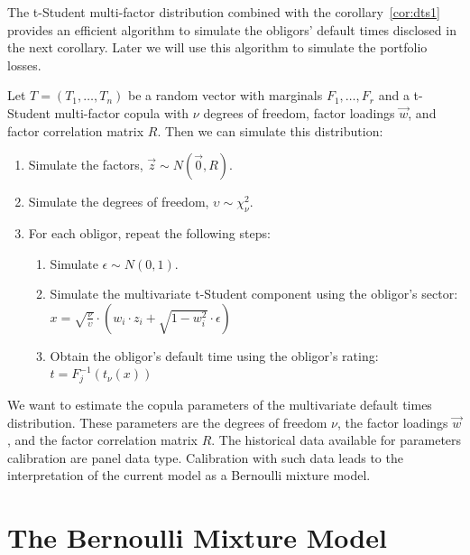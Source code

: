 \documentclass[11pt,fleqn]{book} %
\begin{document}
The t-Student multi-factor distribution combined with the corollary~\ref{cor:dts1} 
provides an efficient algorithm to simulate the obligors' default times 
disclosed in the next corollary. Later we will use this algorithm to simulate
the portfolio losses.

\begin{corollary}
	\label{cor:dts2}
	Let $T=(T_1, \dots, T_n)$ be a random vector with marginals 
	$F_1, \dots, F_r$ and a t-Student multi-factor copula with 
	$\nu$ degrees of freedom, factor loadings $\vec{w}$, and factor correlation 
	matrix $R$. Then we can simulate this distribution:
	\begin{enumerate}
		\item Simulate the factors, $\vec{z} \sim N(\vec{0},R)$.
		\item Simulate the degrees of freedom, $\upsilon \sim \chi_{\nu}^2$.
		\item For each obligor, repeat the following steps:
		\begin{enumerate}
			\item Simulate $\epsilon \sim N(0,1)$.
			\item Simulate the multivariate t-Student component using the obligor's sector:\\
			$
				x = \sqrt{\frac{\nu}{\upsilon}} \cdot \left( w_i \cdot z_i + \sqrt{1-w_i^2} \cdot \epsilon \right)
			$
			\item Obtain the obligor's default time using the obligor's rating:\\
			$
				t = F_j^{-1}\left(t_{\nu}(x)\right)
			$
		\end{enumerate}
	\end{enumerate}
\end{corollary}

We want to estimate the copula parameters of the multivariate default times
distribution. These parameters are the degrees of freedom $\nu$, the factor 
loadings $\vec{w}$, and the factor correlation matrix $R$. The historical 
data available for parameters calibration are panel data type. Calibration 
with such data leads to the interpretation of the current model as a Bernoulli 
mixture model.

\section{The Bernoulli Mixture Model}
\end{document}

